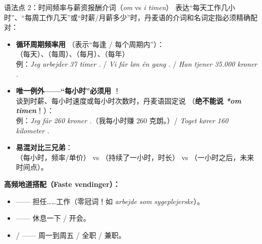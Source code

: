 \begin{grammatikbox}{语法点 2：时间频率与薪资报酬介词（\textit{om} vs \textit{i timen}）}
表达“每天工作几小时”、“每周工作几天”或“时薪/月薪多少”时，丹麦语的介词和名词定指必须精确配对：

\begin{itemize}
  \item \textbf{循环周期频率用 }（表示“每逢 / 每个周期内”）：\\
    （每天）、（每周）、（每月）、（每年）\\
    例：\textit{Jeg arbejder 37 timer .} / \textit{Vi får løn én gang .} / \textit{Han tjener 35.000 kroner .}
  \item \textbf{唯一例外——“每小时”必须用 }！\\
    谈到时薪、每小时速度或每小时次数时，丹麦语固定说 （\textbf{绝不能说 \textit{*om timen}}！）：\\
    例：\textit{Jeg får 260 kroner .}（我每小时赚 260 克朗。）/ \textit{Toget kører 160 kilometer .}
  \item \textbf{易混对比三兄弟}：\\
    （每小时，频率/单价） vs （持续了一小时，时长） vs （一小时之后，未来时间点）。
\end{itemize}

\textbf{高频地道搭配（Faste vendinger）：}
\begin{itemize}
  \item {} —— 担任……工作（零冠词！如 \textit{arbejde som sygeplejerske}）。
  \item {} —— 休息一下 / 开会。
  \item {} /  —— 周一到周五 / 全职 / 兼职。
\end{itemize}
\end{grammatikbox}


